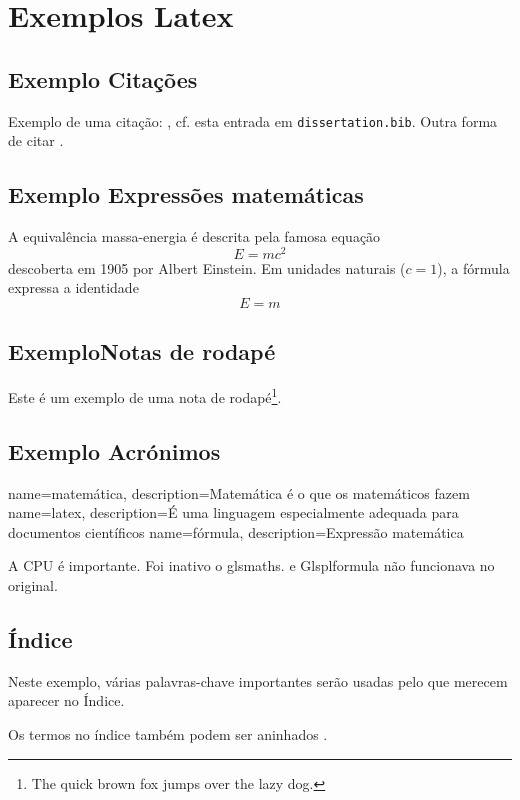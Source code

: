 \chapter{Exemplos Latex}
\section{Exemplo Citações}
Exemplo de uma citação: \textcite{GRM97}, cf. esta entrada em \texttt{dissertation.bib}.
Outra forma de citar \parencite{KeR88}.

\section{Exemplo Expressões matemáticas}
A equivalência massa-energia é descrita pela famosa equação
\begin{equation}
E=mc^2
\end{equation}
descoberta em 1905 por Albert Einstein.
Em unidades naturais ($c = 1$), a fórmula expressa a identidade
\[
E=m
\]

\section{ExemploNotas de rodapé}
Este é um exemplo de uma nota de rodapé\footnote{The quick brown fox jumps over the lazy dog.}.

\section{Exemplo Acrónimos}
{
    name=matemática,
    description={Matemática é o que os matemáticos fazem}
}
{
    name=latex,
    description={É uma linguagem especialmente adequada para
documentos científicos}
}
{
    name=fórmula,
    description={Expressão matemática}
}

A \ac{CPU} é importante.
Foi inativo o  gls{maths}. e Glspl{formula} não funcionava no original.

\section{Índice}

Neste exemplo, várias palavras-chave importantes serão usadas pelo que merecem aparecer no Índice.

Os termos no índice também podem ser aninhados .

